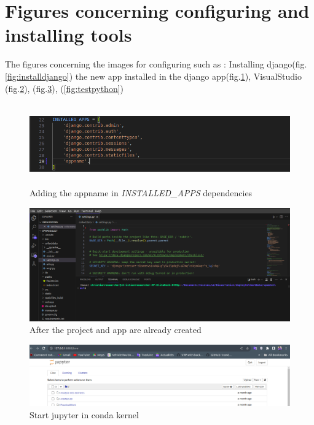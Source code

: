 \documentclass[12pt,a4paper, oneside]{book}
\begin{document}
\section{Figures concerning configuring and installing tools}  
The figures concerning the images for configuring such as : Installing django(fig.\ref{fig:installdjango}) the new app installed in the django app(fig.\ref{fig:appinstallname}), VisualStudio (fig.\ref{fig:visualstudio}), (fig.\ref{fig:jupyteropen}), (\ref{fig:testpython})
\begin{figure}[h]
	\centering
	\includegraphics[width=1\linewidth, height=3.5cm]{appInstallName}
	\caption{Adding the appname in \textit{INSTALLED\_APPS} dependencies }
	\label{fig:appinstallname}
\end{figure}  

\begin{figure}[h]
	\centering
	\includegraphics[width=1\linewidth]{visualStudio}
	\caption{After the project and app are already created}
	\label{fig:visualstudio}
\end{figure}  

\begin{figure}[h]
	\centering
	\includegraphics[width=1\linewidth]{jupyterOpen}
	\caption{Start jupyter in conda kernel}
	\label{fig:jupyteropen}
\end{figure}
\end{document}
